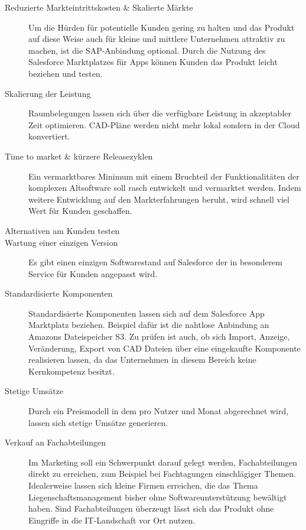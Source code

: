\begin{description}
	\item[Reduzierte Markteintrittskosten \& Skalierte Märkte] Um die 
Hürden für potentielle Kunden gering zu halten und das Produkt auf diese Weise 
auch für kleine und mittlere Unternehmen attraktiv zu machen, ist die 
SAP-Anbindung optional. Durch die Nutzung des Salesforce Marktplatzes für Apps 
können Kunden das Produkt leicht beziehen und testen.
	\item[Skalierung der Leistung] Raumbelegungen lassen sich über die 
verfügbare Leistung in akzeptabler Zeit optimieren. CAD-Pläne werden nicht 
mehr lokal sondern in der Cloud konvertiert.
	\item[Time to market \& kürzere Releasezyklen] Ein vermarktbares 
Minimum mit einem Bruchteil der Funktionalitäten der komplexen Altsoftware soll 
rasch entwickelt und vermarktet werden. Indem weitere Entwicklung auf den 
Markterfahrungen beruht, wird schnell viel Wert für Kunden geschaffen.
	\item[Alternativen am Kunden testen] 
	\item[Wartung einer einzigen Version] Es gibt einen einzigen 
Softwarestand auf Salesforce der in besonderem Service für Kunden angepasst 
wird. 
	\item[Standardisierte Komponenten] Standardisierte Komponenten lassen 
sich auf dem Salesforce App Marktplatz beziehen. Beispiel dafür ist die 
nahtlose Anbindung an Amazons Dateispeicher S3. Zu prüfen ist auch, ob sich 
Import, Anzeige, Veränderung, Export von CAD Dateien über eine eingekaufte 
Komponente realisieren lassen, da das Unternehmen in diesem Bereich keine 
Kernkompetenz besitzt.
	\item[Stetige Umsätze] Durch ein Preismodell in dem pro Nutzer und 
Monat abgerechnet wird, lassen sich stetige Umsätze generieren.
	\item[Verkauf an Fachabteilungen] Im Marketing soll ein Schwerpunkt 
darauf gelegt werden, Fachabteilungen direkt zu erreichen, zum Beispiel bei 
Fachtagungen einschlägiger Themen. Idealerweise lassen sich kleine Firmen 
erreichen, die das Thema Liegenschaftsmanagement bisher ohne 
Softwareunterstützung bewältigt haben. Sind Fachabteilungen überzeugt lässt 
sich das Produkt ohne Eingriffe in die IT-Landschaft vor Ort nutzen.
\end{description}

